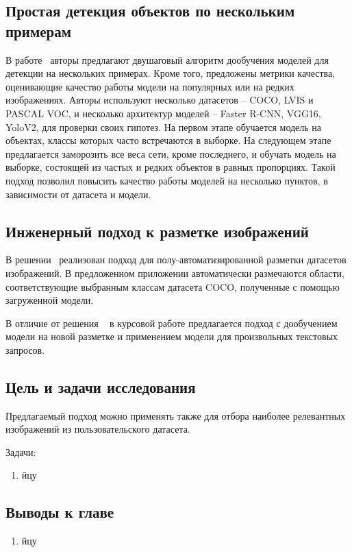 \documentclass[a4paper,14pt]{article}
\begin{document}
    \subsection{Простая детекция объектов по нескольким примерам}

    В работе~\cite{wang2020few} авторы предлагают двушаговый алгоритм дообучения моделей для детекции на нескольких примерах.
    Кроме того, предложены метрики качества, оценивающие качество работы модели на популярных или на редких изображениях.
    Авторы используют несколько датасетов -- COCO, LVIS и PASCAL VOC,
    и несколько архитектур моделей -- Faster R-CNN, VGG16, YoloV2, для проверки своих гипотез.
    На первом этапе обучается модель на объектах, классы которых часто встречаются в выборке.
    На следующем этапе предлагается заморозить все веса сети, кроме последнего, и обучать модель на выборке, состоящей из частых и редких объектов в равных пропорциях.
    Такой подход позволил повысить качество работы моделей на несколько пунктов, в зависимости от датасета и модели.

    \subsection{Инженерный подход к разметке изображений}

    В решении~\cite{AnnoMage} реализован подход для полу-автоматизированной разметки датасетов изображений. В предложенном приложении автоматически размечаются области, соответствующие выбранным классам датасета COCO, полученные с помощью загруженной модели.

    В отличие от решения ~\cite{AnnoMage} в курсовой работе предлагается подход с дообучением модели на новой разметке и применением модели для произвольных текстовых запросов.

    \subsection{Цель и задачи исследования}
    
    Предлагаемый подход можно применять также для отбора наиболее релевантных изображений из пользовательского датасета.

    Задачи:
    \begin{enumerate}
        [1)]
        \itemsep0em
        \item йцу

    \end{enumerate}

    \subsection{Выводы к главе \thesection}
    \begin{enumerate}
        [1)]
        \itemsep0em
        \item йцу
    \end{enumerate}
\end{document}
